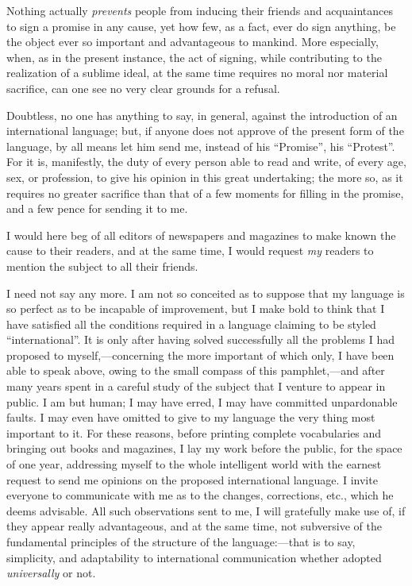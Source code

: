 \documentclass[12pt,twoside]{book}
\begin{document}
Nothing actually \emph{prevents} people from inducing their friends and acquaintances to sign a promise in any cause, yet how few, as a fact, ever do sign anything, be the object ever so important and advantageous to mankind. More especially, when, as in the present instance, the act of signing, while contributing to the realization of a sublime ideal, at the same time requires no moral nor material sacrifice, can one see no very clear grounds for a refusal.

Doubtless, no one has anything to say, in general, against the introduction of an international language; but, if anyone does not approve of the present form of the language, by all means let him send me, instead of his “Promise”, his “Protest”. For it is, manifestly, the duty of every person able to read and write, of every age, sex, or profession, to give his opinion in this great undertaking; the more so, as it requires no greater sacrifice than that of a few moments for filling in the promise, and a few pence for sending it to me.

I would here beg of all editors of newspapers and magazines to make known the cause to their readers, and at the same time, I would request \emph{my} readers to mention the subject to all their friends.

I need not say any more. I am not so conceited as to suppose that my language is so perfect as to be incapable of improvement, but I make bold to think that I have satisfied all the conditions required in a language claiming to be styled “international”. It is only after having solved successfully all the problems I had proposed to myself,---concerning the more important of which only, I have been able to speak above, owing to the small compass of this pamphlet,---and after many years spent in a careful study of the subject that I venture to appear in public. I am but human; I may have erred, I may have committed unpardonable faults. I may even have omitted to give to my language the very thing most important to it. For these reasons, before printing complete vocabularies and bringing out books and magazines, I lay my work before the public, for the space of one year, addressing myself to the whole intelligent world with the earnest request to send me opinions on the proposed international language. I invite everyone to communicate with me as to the changes, corrections, etc., which he deems advisable. All such observations sent to me, I will gratefully make use of, if they appear really advantageous, and at the same time, not subversive of the fundamental principles of the structure of the language:---that is to say, simplicity, and adaptability to international communication whether adopted \emph{universally} or not.
\end{document}
